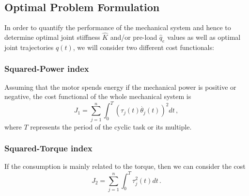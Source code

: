 
\subsection{Optimal Problem Formulation}

In order to quantify the performance of the mechanical system and hence to determine optimal joint stiffness $\hat K$ and/or pre-load $\hat q_e$ values as well as optimal joint trajectories $q(t)$, we will consider two different cost functionals:

\subsubsection{Squared-Power index}
Assuming that the motor spends energy if the mechanical power is positive or negative, the cost functional of the whole mechanical system is 
\begin{equation}
	J_1 = \sum_{j=1}^{n} \int_0^T(\tau_{j}(t)\dot{\theta_{j}}(t))^2dt\,,
\label{eq:J2}
\end{equation}
where $T$ represents the period of the cyclic task or its multiple. %

 
% 


\subsubsection{Squared-Torque index}
If the consumption is mainly related to the torque, then we can consider the cost
\begin{equation}
 J_2 = \sum_{j=1}^{n}\int_{0}^{T}{\tau_j^2 (t) dt}\,.
\label{eq:J3}
\end{equation}
% 
% 

